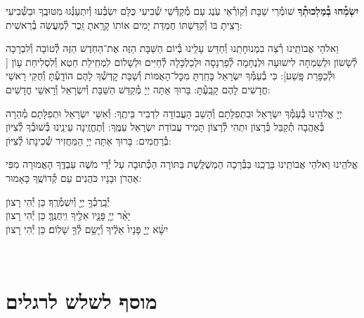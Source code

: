 \documentclass[twoside, openany, parskip=half, 11pt]{book}
\begin{document}
\begin{sometimes}
\textbf{יִשְׂמְ֯חוּ בְ֯מַלְכוּתְ֯ךָ}
שׁוֹמְ֯רֵי שַׁבָּת וְ֯קֽוֹרְ֯אֵי עֹֽנֶג עַם מְ֯קַדְּ֯שֵׁי שְׁ֯בִיעִי כֻּלָּם יִשְׂבְּ֯עוּ וְ֯יִתְעַנְּ֯גוּ מִטּוּבֶֽךָ וּבַשְּׁ֯בִיעִי רָצִֽיתָ בּוֹ וְ֯קִדַּשְׁתּוֹ חֶמְדַּת יָמִים אוֹתוֹ קָרָֽאתָ זֵֽכֶר לְ֯מַעֲשֵׂה בְ֯רֵאשִׁית:

 וֵאלֹהֵי אֲבוֹתֵֽינוּ רְ֯צֵה בִמְנוּחָתֵֽנוּ וְ֯חַדֵּשׁ עָלֵֽינוּ בְּ֯יוֹם הַשַּׁבָּת הַזֶּה אֶת־הַחֹֽדֶשׁ הַזֶּה לְ֯טוֹבָה וְ֯לִבְרָכָה לְ֯שָׂשׂוֹן וּלְשִׂמְחָה לִישׁוּעָה וּלְנֶחָמָה לְ֯פַרְנָסָה וּלְכַלְכָּלָה לְ֯חַיִּים וּלְשָׁלוֹם לִמְחִֽילַת חֵטְא וְ֯לִסְלִיחַת עָוֹן [
וּלְ֯כַפָּרַת פָּֽשַׁע]: כִּי בְ֯עַמְּ֯ךָ יִשְׂרָאֵל בָּחַֽרְתָּ מִכׇּל־הָאֻמּוֹת וְ֯שַׁבַּת קׇדְשְׁ֯ךָ לָהֶם הוֹדָֽעְ֯תָּ וְ֯חֻקֵּי רָאשֵׁי חֳדָשִׁים לָהֶם קָבָֽעְ֯תָּ: בָּרוּךְ אַתָּה יְיָ מְ֯קַדֵּשׁ הַשַּׁבָּת וְ֯יִשְׂרָאֵל וְ֯רָאשֵׁי חֳדָשִׁים: 

\end{sometimes}

יְיָ אֱלֹהֵֽינוּ בְּ֯עַמְּ֯ךָ יִשְׂרָאֵל וּבִתְפִלָּתָם וְ֯הָשֵׁב הָעֲבוֹדָה לִדְבִיר בֵּיתֶֽךָ: וְ֯אִשֵּׁי יִשְׂרָאֵל וּתְפִלָּתָם מְ֯הֵרָה בְּ֯אַהֲבָה תְ֯קַבֵּל בְּ֯רָצוֹן וּתְהִי לְ֯רָצוֹן תָּמִיד עֲבוֹדַת יִשְׂרָאֵל עַמֶּֽךָ: וְ֯תֶחֱזֶֽינָה עֵינֵֽינוּ בְּ֯שׁוּבְ֯ךָ לְ֯צִיּוֹן בְּ֯רַחֲמִים:
בָּרוּךְ אַתָּה יְיָ הַמַּחֲזִיר שְׁ֯כִינָתוֹ לְ֯צִיּוֹן:

\modim

\nextpage

\shabboschanukah

\shabboshodos

\vspace{.5\baselineskip}

אֱלֹהֵֽינוּ וֵאלֹהֵי אֲבוֹתֵֽינוּ בָּרֲכֵֽנוּ בַּבְּ֯רָכָה הַמְשֻׁלֶּֽשֶׁת בַּתּוֹרָה
הַכְּ֯תוּבָה עַל יְ֯דֵי מֹשֶׁה עַבְדֶּֽךָ הָאֲמוּרָה מִפִּי אַהֲרֹן וּבָנָיו כֹּהֲנִים עַם קְ֯דוֹשֶֽׁךָ כָּאָמוּר:

יְ֯בָֽרֶכְ֯ךָ֥ יְיָ֖ וְ֯יִשְׁמְ֯רֶֽךָ׃ \hfill \kahal כֵּן יְ֯הִי רָצוׂן \\
יָאֵ֨ר יְיָ֧ פָּנָ֛יו אֵלֶ֖יךָ וִֽיחֻנֶּֽךָּ׃ \hfill \kahal כֵּן יְ֯הִי רָצוׂן \\
יִשָּׂ֨א יְיָ֤ פָּנָיו֙ אֵלֶ֔יךָ וְ֯יָשֵׂ֥ם לְ֯ךָ֖ שָׁלֽוֹם׃ \hfill \kahal כֵּן יְ֯הִי רָצוׂן


\shabbossimshalom


\tachanunim

\\

\section[מוסף לשלש לרגלים]{ מוסף לשלש לרגלים ‎}
\label{musaphregel}
\end{document}
